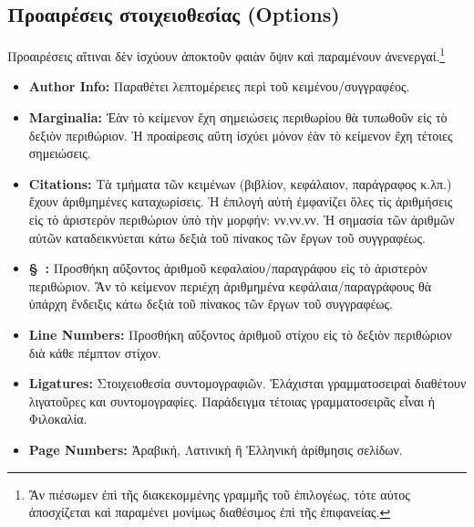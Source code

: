 \documentclass[12pt,a4paper]{article}
\begin{document}
  \subsection{Προαιρέσεις στοιχειοθεσίας (Options)}
    Προαιρέσεις αἵτιναι δὲν ἰσχύουν ἀποκτοῦν φαιὰν ὄψιν καὶ παραμένουν
    ἀνενεργαί.\footnote{Ἂν πιέσωμεν ἐπὶ τῆς διακεκομμένης γραμμῆς τοῦ
    ἐπιλογέως, τότε αὐτος ἀποσχίζεται καὶ παραμένει μονίμως διαθέσιμος
    ἐπὶ τῆς ἐπιφανείας.}
    \begin{itemize}
      \item {\bf Author Info:} Παραθέτει λεπτομέρειες περὶ τοῦ κειμένου/συγγραφέος.
      \item {\bf Marginalia: } Ἐὰν τὸ κείμενον ἔχη σημειώσεις
        περιθωρίου θὰ τυπωθοῦν εἰς τὸ δεξιὸν περιθώριον. Ἡ προαίρεσις αὕτη
        ἰσχύει μόνον ἐὰν τὸ κείμενον ἔχη τέτοιες σημειώσεις.
      \item {\bf Citations: } Τὰ τμήματα τῶν κειμένων (βιβλίον, κεφάλαιον,
        παράγραφος κ.λπ.) ἔχουν ἀριθμημένες καταχωρίσεις. Ἡ ἐπιλογὴ αὐτὴ
        ἐμφανίζει ὅλες τὶς ἀριθμήσεις εἰς τὸ ἀριστερὸν περιθώριον ὑπὸ τὴν
        μορφήν: νν.νν.νν.  Ἡ σημασία τῶν ἀριθμῶν αὐτῶν καταδεικνύεται
        κάτω δεξιὰ τοῦ πίνακος τῶν ἔργων τοῦ συγγραφέως.
      \item {\bf \S\ :} Προσθήκη αὔξοντος ἀριθμοῦ κεφαλαίου/παραγράφου
        εἰς τὸ ἀριστερὸν περιθώριον.
        Ἂν τὸ κείμενον περιέχη ἀριθμημένα κεφάλαια/παραγράφους θὰ ὑπάρχη
        ἔνδειξις κάτω δεξιὰ τοῦ πίνακος τῶν ἔργων τοῦ συγγραφέως.
      \item {\bf Line Numbers:} Προσθήκη αὔξοντος ἀριθμοῦ στίχου εἰς τὸ δεξιὸν
        περιθώριον διὰ κάθε πέμπτον στίχον.
      \item {\bf Ligatures:} Στοιχειοθεσία συντομογραφιῶν. Ἐλάχισται
        γραμματοσειραὶ διαθέτουν λιγατοῦρες και συντομογραφίες. Παράδειγμα
        τέτοιας γραμματοσειρᾶς εἶναι ἡ Φιλοκαλία.
      \item {\bf Page Numbers:} Ἀραβική, Λατινικὴ ἢ Ἑλληνικὴ ἀρίθμησις σελίδων.
    \end{itemize}
\end{document}
